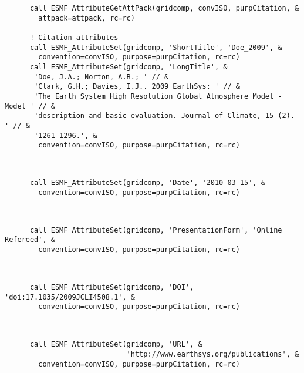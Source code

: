  \begin{verbatim}
      call ESMF_AttributeGetAttPack(gridcomp, convISO, purpCitation, &
        attpack=attpack, rc=rc)

      ! Citation attributes
      call ESMF_AttributeSet(gridcomp, 'ShortTitle', 'Doe_2009', &
        convention=convISO, purpose=purpCitation, rc=rc)
      call ESMF_AttributeSet(gridcomp, 'LongTitle', &
       'Doe, J.A.; Norton, A.B.; ' // &
       'Clark, G.H.; Davies, I.J.. 2009 EarthSys: ' // &
       'The Earth System High Resolution Global Atmosphere Model - Model ' // &
       'description and basic evaluation. Journal of Climate, 15 (2). ' // &
       '1261-1296.', &
        convention=convISO, purpose=purpCitation, rc=rc)
 
\end{verbatim}
 

 \begin{verbatim}

      call ESMF_AttributeSet(gridcomp, 'Date', '2010-03-15', &
        convention=convISO, purpose=purpCitation, rc=rc)
 
\end{verbatim}
 

 \begin{verbatim}

      call ESMF_AttributeSet(gridcomp, 'PresentationForm', 'Online Refereed', &
        convention=convISO, purpose=purpCitation, rc=rc)
 
\end{verbatim}
 

 \begin{verbatim}

      call ESMF_AttributeSet(gridcomp, 'DOI', 'doi:17.1035/2009JCLI4508.1', &
        convention=convISO, purpose=purpCitation, rc=rc)
 
\end{verbatim}
 

 \begin{verbatim}

      call ESMF_AttributeSet(gridcomp, 'URL', &
                             'http://www.earthsys.org/publications', &
        convention=convISO, purpose=purpCitation, rc=rc)

 
\end{verbatim}
 
